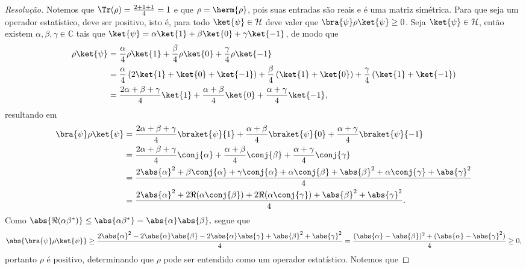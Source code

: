 \begin{proof}[Resolução]
   Notemos que \(\Tr(\rho) = \frac{2 + 1 + 1}{4} = 1\) e que \(\rho = \herm{\rho}\), pois suas entradas são reais e é uma matriz simétrica. Para que seja um operador estatístico, deve ser positivo, isto é, para todo \(\ket{\psi} \in \mathcal{H}\) deve valer que \(\bra{\psi}\rho\ket{\psi} \geq 0\). Seja \(\ket{\psi} \in \mathcal{H}\), então existem \(\alpha, \beta, \gamma \in \mathbb{C}\) tais que \( \ket{\psi} = \alpha \ket{1} + \beta \ket{0} + \gamma \ket{-1}\), de modo que
   \begin{align*}
      \rho \ket{\psi} &= \frac\alpha4\rho \ket{1} + \frac\beta4\rho\ket{0} + \frac\gamma4\rho\ket{-1}\\
                      &= \frac\alpha4\left(2\ket{1} + \ket{0} + \ket{-1}\right) + \frac\beta4 \left(\ket{1} + \ket{0}\right) + \frac\gamma4 \left(\ket{1} + \ket{-1}\right)\\
                      &= \frac{2\alpha + \beta + \gamma}{4}\ket{1} + \frac{\alpha + \beta}{4}\ket{0} + \frac{\alpha + \gamma}{4}\ket{-1},
   \end{align*}
   resultando em
   \begin{align*}
      \bra{\psi}\rho\ket{\psi} &= \frac{2\alpha + \beta + \gamma}{4}\braket{\psi}{1} + \frac{\alpha + \beta}{4}\braket{\psi}{0} + \frac{\alpha + \gamma}{4}\braket{\psi}{-1}\\
                               &= \frac{2\alpha + \beta + \gamma}{4} \conj{\alpha} + \frac{\alpha + \beta}{4}\conj{\beta} + \frac{\alpha + \gamma}{4}\conj{\gamma}\\
                               &= \frac{2 \abs{\alpha}^2 + \beta \conj{\alpha} + \gamma \conj{\alpha} + \alpha \conj{\beta} + \abs{\beta}^2 + \alpha \conj{\gamma} + \abs{\gamma}^2}{4}\\
                               &= \frac{2 \abs{\alpha}^2 + 2 \Re(\alpha \conj{\beta}) + 2 \Re(\alpha \conj{\gamma}) + \abs{\beta}^2 + \abs{\gamma}^2}{4}.
   \end{align*}
   Como \(\abs{\Re(\alpha \beta^*)} \leq \abs{\alpha \beta^*} = \abs{\alpha} \abs{\beta},\) segue que
   \begin{equation*}
      \abs{\bra{\psi}\rho\ket{\psi}} \geq \frac{2 \abs{\alpha}^2 - 2 \abs{\alpha}\abs{\beta} - 2 \abs{\alpha}\abs{\gamma} + \abs{\beta}^2 + \abs{\gamma}^2}{4} = \frac{(\abs{\alpha} - \abs{\beta})^2 + (\abs{\alpha} - \abs{\gamma}^2)}{4} \geq 0,
   \end{equation*}
   portanto \(\rho\) é positivo, determinando que \(\rho\) pode ser entendido como um operador estatístico. Notemos que

\end{proof}
